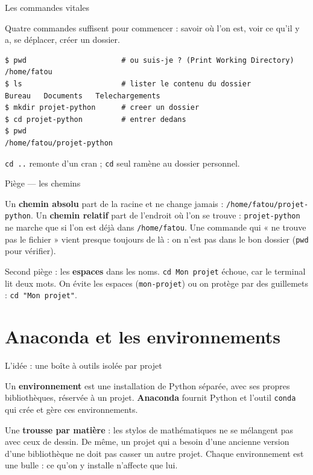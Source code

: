 \documentclass[aspectratio=169,11pt]{beamer}
\begin{document}
\begin{frame}[fragile]{Les commandes vitales}
\begin{ucadex}
{\small Quatre commandes suffisent pour commencer : savoir où l'on est, voir ce qu'il y a, se déplacer, créer un dossier.}
\end{ucadex}
\begin{lstlisting}[style=sh]
$ pwd                      # ou suis-je ? (Print Working Directory)
/home/fatou
$ ls                       # lister le contenu du dossier
Bureau   Documents   Telechargements
$ mkdir projet-python      # creer un dossier
$ cd projet-python         # entrer dedans
$ pwd
/home/fatou/projet-python
\end{lstlisting}
{\small \texttt{cd ..} remonte d'un cran ; \texttt{cd} seul ramène au dossier personnel.}
\end{frame}

\begin{frame}{Piège — les chemins}
\begin{ucadpiege}
{\small Un \textbf{chemin absolu} part de la racine et ne change jamais : \texttt{/home/fatou/projet-python}. Un \textbf{chemin relatif} part de l'endroit où l'on se trouve : \texttt{projet-python} ne marche que si l'on est déjà dans \texttt{/home/fatou}. Une commande qui « ne trouve pas le fichier » vient presque toujours de là : on n'est pas dans le bon dossier (\texttt{pwd} pour vérifier).}
\end{ucadpiege}
{\small Second piège : les \textbf{espaces} dans les noms. \texttt{cd Mon projet} échoue, car le terminal lit deux mots. On évite les espaces (\texttt{mon-projet}) ou on protège par des guillemets : \texttt{cd "Mon projet"}.}
\end{frame}

\section{Anaconda et les environnements}

\begin{frame}{L'idée : une boîte à outils isolée par projet}
\begin{ucaddef}
{\small Un \textbf{environnement} est une installation de Python séparée, avec ses propres bibliothèques, réservée à un projet. \textbf{Anaconda} fournit Python et l'outil \texttt{conda} qui crée et gère ces environnements.}
\end{ucaddef}
\begin{ucadfront}[Analogie]
{\small Une \textbf{trousse par matière} : les stylos de mathématiques ne se mélangent pas avec ceux de dessin. De même, un projet qui a besoin d'une ancienne version d'une bibliothèque ne doit pas casser un autre projet. Chaque environnement est une bulle : ce qu'on y installe n'affecte que lui.}
\end{ucadfront}
\end{frame}
\end{document}

